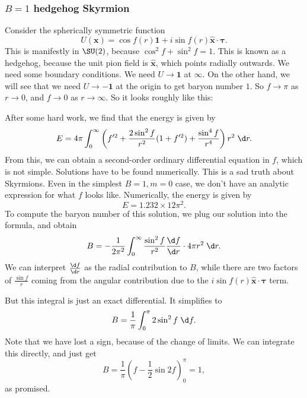 \documentclass[a4paper]{article}
\begin{document}
\subsubsection*{$B = 1$ hedgehog Skyrmion}
Consider the spherically symmetric function
\[
  U(\mathbf{x}) = \cos f(r) \mathbf{1} + i \sin f(r) \hat{\mathbf{x}} \cdot \boldsymbol\tau.
\]
This is manifestly in $\SU(2)$, because $\cos^2 f + \sin^2 f = 1$. This is known as a hedgehog, because the unit pion field is $\hat{\mathbf{x}}$, which points radially outwards. We need some boundary conditions. We need $U \to \mathbf{1}$ at $\infty$. On the other hand, we will see that we need $U \to -\mathbf{1}$ at the origin to get baryon number $1$. So $f \to \pi$ as $r \to 0$, and $f \to 0$ as $r \to \infty$. So it looks roughly like this:
\begin{center}
\end{center}
After some hard work, we find that the energy is given by
\[
  E = 4\pi \int_0^\infty \left(f'^2 + \frac{2 \sin^2 f}{r^2}(1 + f'^2) + \frac{\sin^4 f}{r^4}\right) r^2\;\d r.
\]
From this, we can obtain a second-order ordinary differential equation in $f$, which is not simple. Solutions have to be found numerically. This is a sad truth about Skyrmions. Even in the simplest $B = 1, m = 0$ case, we don't have an analytic expression for what $f$ looks like. Numerically, the energy is given by
\[
  E = 1.232 \times 12\pi^2.
\]
To compute the baryon number of this solution, we plug our solution into the formula, and obtain
\[
  B = - \frac{1}{2\pi^2} \int_0^\infty \frac{\sin^2 f}{r^2} \frac{\d f}{\d r} \cdot 4\pi r^2 \;\d r.
\]
We can interpret $\frac{\d f}{\d r}$ as the radial contribution to $B$, while there are two factors of $\frac{\sin f}{r}$ coming from the angular contribution due to the $i \sin f(r) \hat{\mathbf{x}} \cdot \boldsymbol\tau$ term.

But this integral is just an exact differential. It simplifies to
\[
  B = \frac{1}{\pi} \int_0^\pi 2 \sin^2 f \;\d f.
\]
Note that we have lost a sign, because of the change of limits. We can integrate this directly, and just get
\[
  B = \frac{1}{\pi}\left(f - \frac{1}{2} \sin 2f\right)^\pi_0 = 1,
\]
as promised.
\end{document}

